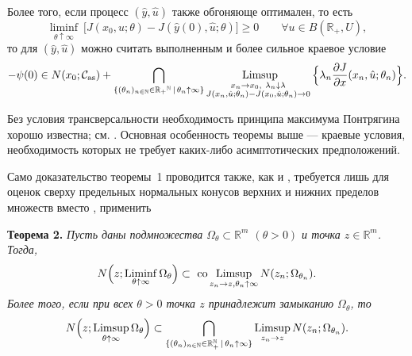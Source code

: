 {  Более того, если процесс $(\hat{y},\hat{u})$ также обгоняюще оптимален, то есть
  \[ \liminf_{\theta\uparrow\infty}\ 
  \big[J(x_0, u; \theta)-J(\hat{y}(0), \hat{u}; \theta)\big]
  \geq 0\qquad \forall u\in B(\mathbb{R}_+,U),\]
  то для $(\hat{y},\hat{u})$ можно считать выполненным и  более сильное краевое условие
	\begin{equation*}
-{\psi}(0)\in N(x_0;\mathcal{C}_{ \mathrm{as}})+\bigcap_{\{(\theta_n)_{n\in\mathbb{N}}\in\mathbb{R}_+{}^\mathbb{N}\,|\,\theta_n\uparrow\infty\}}
\mathop{\hbox{  \rm{Limsup}}}_{\substack
	{x_n\to x_0,\ \lambda_n\downarrow {\lambda}\\ {J}(x_n,\hat{u};\theta_n)-{J}(x_0,\hat{u};\theta_n)\to 0}
}
\Big\{\lambda_n\frac{\partial {J}}{\partial x}(x_n,\hat{u};\theta_n)
\Big\}.
\label{khlopin_ALL2}
\end{equation*}
}






 Без условия трансверсальности необходимость принципа максимума Понтрягина хорошо известна; см. \cite{Halkin}. Основная особенность теоремы выше ---  краевые условия, необходимость которых не требует каких-либо асимптотических предположений. 
 
 
 
  
  	Само доказательство теоремы~1 проводится также, как и \cite[Theorem~4.1,Theorem~4.6]{arxiv}, требуется лишь  для оценок сверху  предельных нормальных конусов верхних и нижних пределов множеств вместо \cite[Lemma~6.1,6.7]{arxiv},
  	\cite[Theorem~6.2]{Ledyaev} применить
	
	{\bf Теорема 2.} {\it       Пусть даны подмножества  $\Omega_\theta\subset\mathbb{R}^m$  $(\theta> 0)$ и 
		точка $z\in\mathbb{R}^m$. Тогда,
				\begin{align*}
		N\Big(z;\mathop{  \rm{Liminf}}_{\theta\uparrow\infty}\Omega_\theta\Big)\subset 
			\mathop{\hbox{  \rm{co}}}
		\mathop{  \rm{Limsup}}_{{z}_n\to z,\theta_n\uparrow\infty}  {N}({z}_n;\Omega_{\theta_n}).
		\end{align*}
		Более того, если при всех  $\theta> 0$
		точка $z$ принадлежит замыканию $\Omega_\theta$, то
				\begin{align*}
		N\Big(z; \mathop{  \rm{Limsup}}_{\theta\uparrow\infty} \Omega_\theta\Big)
		\subset
		\bigcap_{\{(\theta_n)_{n\in\mathbb{N}}\in\mathbb{R}_{+}^{\mathbb{N}}\,|\,\theta_n\uparrow\infty\}}
		        \mathop{  \rm{Limsup}}_{{z}_n\to {z}}{N}({z}_n;\Omega_{\theta_n}).
		\end{align*}
	}

